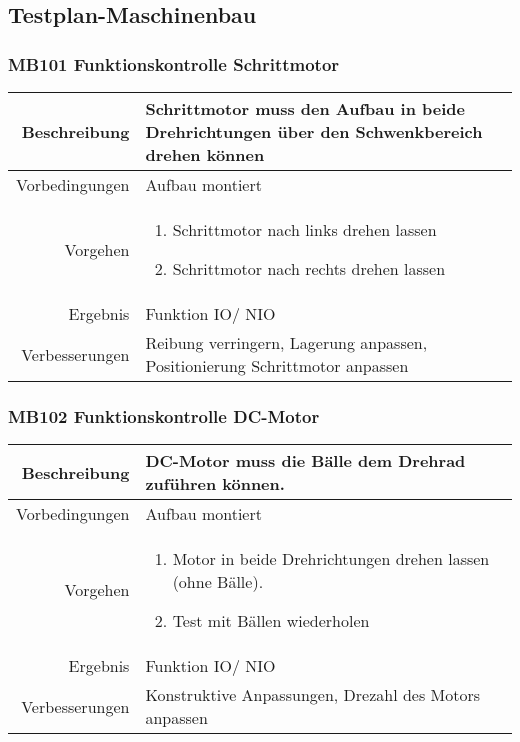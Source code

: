 \subsection{Testplan-Maschinenbau}
\subsubsection{MB101 Funktionskontrolle Schrittmotor}
\begin{table}[h!]
	\renewcommand{\arraystretch}{1.5}
	\begin{tabular}{|r|p{13cm}|}
		\hline Beschreibung & Schrittmotor muss den Aufbau in beide Drehrichtungen über den Schwenkbereich drehen können  \\ 
		\hline Vorbedingungen & Aufbau montiert \\ 
		\hline Vorgehen & 
		\begin{enumerate}
			\item Schrittmotor nach links drehen lassen 
			\item Schrittmotor nach rechts drehen lassen
		\end{enumerate} \\ 
		\hline Ergebnis & Funktion IO/ NIO \\ 
		\hline Verbesserungen & Reibung verringern, Lagerung anpassen, Positionierung Schrittmotor anpassen \\ 
		\hline 
	\end{tabular}
\end{table}

\subsubsection{MB102 Funktionskontrolle DC-Motor}
\begin{table}[h!]
	\renewcommand{\arraystretch}{1.5}
	\begin{tabular}{|r|p{13cm}|}
		\hline Beschreibung & DC-Motor muss die Bälle dem Drehrad zuführen können.  \\ 
		\hline Vorbedingungen & Aufbau montiert \\ 
		\hline Vorgehen & 
		\begin{enumerate}
			\item Motor in beide Drehrichtungen drehen lassen (ohne Bälle). 
			\item Test mit Bällen wiederholen
		\end{enumerate} \\ 
		\hline Ergebnis & Funktion IO/ NIO \\ 
		\hline Verbesserungen & Konstruktive Anpassungen, Drezahl des Motors anpassen \\ 
		\hline 
	\end{tabular}
\end{table}
\newpage

